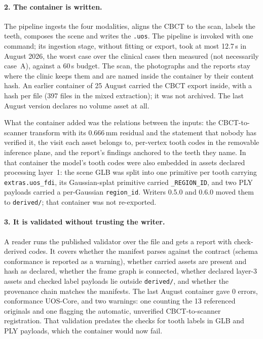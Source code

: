\documentclass[11pt,a4paper]{article}
\newcommand{\code}[1]{\texttt{\small #1}}
\begin{document}
\paragraph{2. The container is written.} The pipeline ingests the four modalities, aligns
the CBCT to the scan, labels the teeth, composes the scene and writes the \code{.uos}.
The pipeline is invoked with one command; its ingestion stage, without fitting or export,
took at most 12.7\,s in August 2026, the worst case over the clinical cases then measured
(not necessarily case~A), against a 60\,s budget. The scan, the photographs and the reports
stay where the clinic keeps them and are named inside the container by their content hash.
An earlier container of 25 August carried the CBCT export inside, with a hash per file
(397 files in the mixed extraction); it was not archived. The last August version declares
no volume asset at all.

What the container added was the relations between the inputs: the CBCT-to-scanner transform
with its 0.666\,mm residual and the statement that nobody has verified it, the visit each
asset belongs to, per-vertex tooth codes in the removable inference plane, and the report's
findings anchored to the teeth they name. In that container the model's tooth codes were
also embedded in assets declared processing layer~1: the scene GLB was split into one
primitive per tooth carrying \code{extras.uos\_fdi}, its Gaussian-splat primitive carried
\code{\_REGION\_ID}, and two PLY payloads carried a per-Gaussian \code{region\_id}.
Writers 0.5.0 and 0.6.0 moved them to \code{derived/}; that container was not re-exported.

\paragraph{3. It is validated without trusting the writer.} A reader runs the published
validator over the file and gets a report with check-derived codes. It covers whether the
manifest parses against the contract (schema conformance is reported as a warning), whether
carried assets are present and hash as declared, whether the frame graph is connected,
whether declared layer-3 assets and checked label payloads lie outside \code{derived/}, and
whether the provenance chain matches the manifests. The last August container gave 0 errors,
conformance UOS-Core, and two warnings: one counting the 13 referenced originals and one
flagging the automatic, unverified CBCT-to-scanner registration. That validation predates
the checks for tooth labels in GLB and PLY payloads, which the container would now fail.
\end{document}
